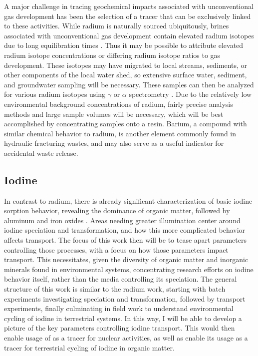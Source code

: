 \documentclass[twoside,12pt,titlepage]{article}
\newcommand{\isotope}[2]{\ch{^{#1}#2}}
\begin{document}
\par A major challenge in tracing geochemical impacts associated with unconventional gas development has been the selection of a tracer that can be exclusively linked to these activities. While radium is naturally sourced ubiquitously, brines associated with unconventional gas development contain elevated radium isotopes due to long equilibration times \cite{Barbot2013}. Thus it may be possible to attribute elevated radium isotope concentrations or differing radium isotope ratios to gas development. These isotopes may have migrated to local streams, sediments, or other components of the local water shed, so extensive surface water, sediment, and groundwater sampling will be necessary. These samples can then be analyzed for various radium isotopes using $\gamma$ or $\alpha$ spectrometry \cite{Elsinger1982,Bojanowski2005}. Due to the relatively low environmental background concentrations of radium, fairly precise analysis methods and large sample volumes will be necessary, which will be best accomplished by concentrating samples onto a resin. Barium, a compound with similar chemical behavior to radium, is another element commonly found in hydraulic fracturing wastes, and may also serve as a useful indicator for accidental waste release.

\subsection{Iodine}

In contrast to radium, there is already significant characterization of basic iodine sorption behavior, revealing the dominance of organic matter, followed by aluminum and iron oxides \cite{Kaplan2014}. Areas needing greater illumination center around iodine speciation and transformation, and how this more complicated behavior affects transport. The focus of this work then will be to tease apart parameters controlling those processes, with a focus on how those parameters impact transport. This necessitates, given the diversity of organic matter and inorganic minerals found in environmental systems,  concentrating research efforts on iodine behavior itself, rather than the media controlling its speciation. The general structure of this work is similar to the radium work, starting with batch experiments investigating speciation and transformation, followed by transport experiments, finally culminating in field work to understand environmental cycling of iodine in terrestrial systems. In this way, I will be able to develop a picture of the key parameters controlling iodine transport. This would then enable usage of \isotope{129}{I} as a tracer for nuclear activities, as well as enable its usage as a tracer for terrestrial cycling of iodine in organic matter.
\end{document}
